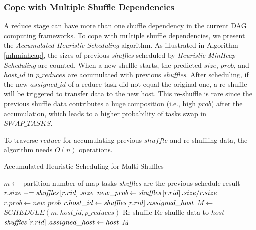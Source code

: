 \subsubsection{Cope with Multiple Shuffle Dependencies}
{\color{black}
A reduce stage can have more than one shuffle dependency in the current DAG computing frameworks.
To cope with multiple shuffle dependencies, we present the \textit{Accumulated Heuristic Scheduling} algorithm.
}
As illustrated in Algorithm \ref{mhminheap}, the sizes of previous \textit{shuffles} scheduled by \textit{Heuristic MinHeap Scheduling} are counted. 
When a new shuffle starts, the predicted $size$, $prob$, and $host\_id$ in $p\_reduces$ are accumulated with previous \textit{shuffles}. 
After scheduling, if the new $assigned\_id$ of a reduce task did not equal the original one, a re-shuffle will be triggered to transfer data to the new host. 
This re-shuffle is rare since the previous shuffle data contributes a huge composition (i.e., high $prob$) after the accumulation, 
which leads to a higher probability of tasks swap in $SWAP\_TASKS$. 

To traverse $reduce$ for accumulating previous $shuffle$ and re-shuffling data, the algorithm needs $O(n)$ operations.
	
\begin{minipage}{0.95\columnwidth}
	\begin{algorithm}[H]
	\caption{Accumulated Heuristic Scheduling for Multi-Shuffles}
	\label{mhminheap}
		\begin{algorithmic}[1]
		\small
			\State $m\gets$ partition number of map tasks
			\Comment \textit{shuffles} are the previous schedule result 
				\State $r.size \mathrel{+}= \text{\textit{shuffles}}\left[r.rid\right].size$
				\State $new\_prob\gets \text{\textit{shuffles}}\left[r.rid\right].size / r.size$
					\State $r.prob\gets new\_prob$
					\State $r.host\_id\gets \text{\textit{shuffles}}\left[r.rid\right].assigned\_host$
				\EndIf
			\EndFor
			\State $M\gets$ $SCHEDULE\left(m, host\_id, p\_reduces\right)$
				\Comment Re-shuffle
					\State Re-shuffle data to $host$
					\State $\text{\textit{shuffles}}\left[r.rid\right].assigned\_host\gets host$
					\EndIf
				\EndFor
			\EndFor
			\Return $M$
		\EndProcedure
		\end{algorithmic}
	\end{algorithm}
\end{minipage}